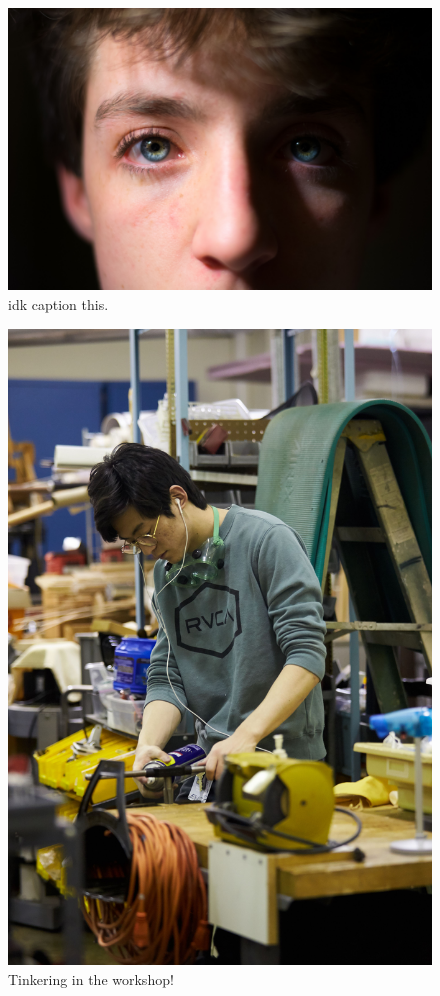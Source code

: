 \documentclass{report}
\begin{document}
\begin{figure}
  \includegraphics[width=\linewidth]{res/port_tyson.jpg}
  \caption{idk caption this.}
\end{figure}

\begin{figure}
  \includegraphics[width=\linewidth]{res/port_sir.jpg}
  \caption{Tinkering in the workshop!}
\end{figure}
\end{document}
